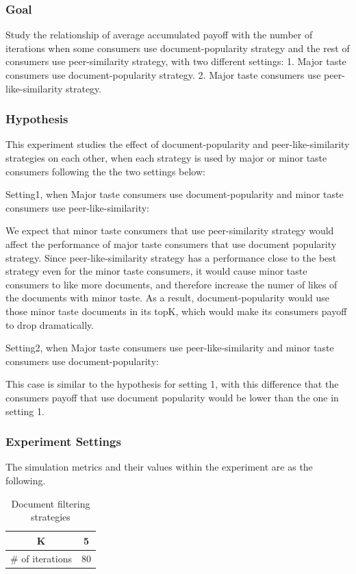 \documentclass [12pt]{article} \usepackage{multicol}
\begin{document}
\subsubsection{Goal}
 Study the relationship of average accumulated payoff with the number of iterations  
 when some consumers use document-popularity strategy and the rest of consumers use peer-similarity 
strategy, with two different settings: 1. Major taste consumers use document-popularity strategy. 2. Major taste consumers
use peer-like-similarity strategy.


\subsubsection{Hypothesis}

This experiment studies the effect of document-popularity and peer-like-similarity strategies on each other, 
when each strategy is used by major or minor taste consumers following the the two settings below:

Setting1, when Major taste consumers use document-popularity and minor taste consumers use peer-like-similarity:
 
We expect that minor taste consumers that use peer-similarity strategy would affect the performance of major taste consumers that use document popularity strategy.  
Since peer-like-similarity strategy has a performance close to the best strategy even for the minor taste consumers, it would cause minor taste consumers
to like more documents, and therefore increase the numer of likes of the documents with minor taste. As a result, 
document-popularity would use those  minor taste documents in its topK, which would make its consumers payoff to drop dramatically. 

Setting2, when Major taste consumers use peer-like-similarity and minor taste consumers use document-popularity:

This case is similar to the hypothesis for setting 1, with this difference that the  consumers payoff that use document popularity would be lower than
the one in setting 1.  


\subsubsection{Experiment Settings}

The simulation metrics and their values within the experiment are as the following.

\begin{table}[h!]
\caption{Document filtering strategies}
\begin{center}


\begin{tabular}{|c|c|}
\hline
K   & 5 \\ \hline
\# of iterations & 80 \\ \hline
\end{tabular}


\end{center}
\label{default}
\end{table}
\end{document}
